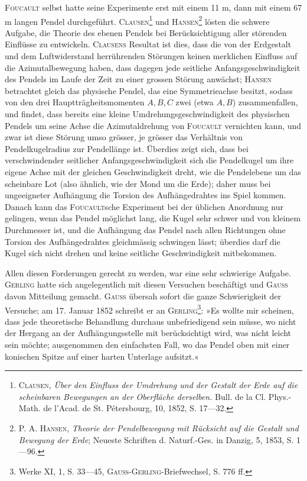 \textsc{Foucault} selbst hatte seine Experimente erst mit einem 11 m, dann mit einem
67 m langen Pendel durchgeführt. \textsc{Clausen}\footnote{\textsc{Clausen}, \textit{Über den Einfluss der Umdrehung und der Gestalt der Erde auf die scheinbaren Bewegungen
an der Oberfläche derselben.} Bull. de la Cl. Phys.-Math. de l’Acad. de St. Pétersbourg, 10, 1852,
S. 17—32.} und \textsc{Hansen}\footnote{P. A. \textsc{Hansen}, \textit{Theorie der Pendelbewegung mit Rücksicht auf die Gestalt und Bewegung der
Erde}; Neueste Schriften d. Naturf.-Ges. in Danzig, 5, 1853, S. 1—96.} lösten die schwere
\clearpage{}
\noindent Aufgabe, die Theorie des ebenen Pendels bei Berücksichtigung aller störenden
Einflüsse zu entwickeln. \textsc{Clausens} Resultat ist dies, dass die von der Erdgestalt
und dem Luftwiderstand herrührenden Störungen keinen merklichen
Einfluss auf die Azimutalbewegung haben, dass dagegen jede seitliche Anfangsgeschwindigkeit
des Pendels im Laufe der Zeit zu einer grossen Störung anwächst;
\textsc{Hansen} betrachtet gleich das physische Pendel, das eine Symmetrieachse
besitzt, sodass von den drei Hauptträgheitsmomenten $A,B,C$ zwei (etwa
$A,B$) zusammenfallen, und findet, dass bereits eine kleine Umdrehungsgeschwindigkeit
des physischen Pendels um seine Achse die Azimutaldrehung
von \textsc{Foucault} vernichten kann, und zwar ist diese Störung umso grösser, je
grösser das Verhältnis von Pendelkugelradius zur Pendellänge ist. Überdies
zeigt sich, dass bei verschwindender seitlicher Anfangsgeschwindigkeit sich die
Pendelkugel um ihre eigene Achse mit der gleichen Geschwindigkeit dreht,
wie die Pendelebene um das scheinbare Lot (also ähnlich, wie der Mond um
die Erde); daher muss bei ungeeigneter Aufhängung die Torsion des Aufhängedrahtes
ins Spiel kommen. Danach kann das \textsc{Foucault}sche Experiment
bei der üblichen Anordnung nur gelingen, wenn das Pendel möglichst lang,
die Kugel sehr schwer und von kleinem Durchmesser ist, und die Aufhängung
das Pendel nach allen Richtungen ohne Torsion des Aufhängedrahtes gleichmässig
schwingen lässt; überdies darf die Kugel sich nicht drehen und keine
seitliche Geschwindigkeit mitbekommen.

Allen diesen Forderungen gerecht zu werden, war eine sehr schwierige
Aufgabe. \textsc{Gerling} hatte sich angelegentlich mit diesen Versuchen beschäftigt
und \textsc{Gauss} davon Mitteilung gemacht. \textsc{Gauss} übersah sofort die ganze Schwierigkeit
der Versuche; am 17. Januar 1852 schreibt er an \textsc{Gerling}\footnote{Werke XI, 1, S. 33—45, \textsc{Gauss-Gerling}-Briefwechsel, S. 776 ff.}: »Es wollte
mir scheinen, dass jede theoretische Behandlung durchaus unbefriedigend sein
müsse, wo nicht der Hergang an der Aufhängungsstelle mit berücksichtigt
wird, was nicht leicht sein möchte; ausgenommen den einfachsten Fall, wo
das Pendel oben mit einer konischen Spitze auf einer harten Unterlage aufsitzt.«

